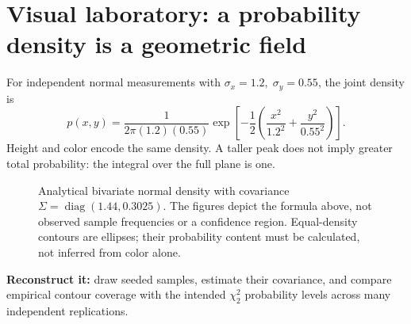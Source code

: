 \clearpage
\section*{Visual laboratory: a probability density is a geometric field}
\noindent For independent normal measurements with
\(\sigma_x=1.2,\;\sigma_y=0.55\), the joint density is
\[
p(x,y)=\frac{1}{2\pi(1.2)(0.55)}
\exp\!\left[-\frac12\!\left(\frac{x^2}{1.2^2}+
\frac{y^2}{0.55^2}\right)\right].
\]
Height and color encode the same density. A taller peak does not imply
greater total probability: the integral over the full plane is one.
\begin{figure}[!htbp]
\centering
{}
\caption{Analytical bivariate normal density with covariance
\(\Sigma=\operatorname{diag}(1.44,0.3025)\).
The figures depict the formula above, not observed sample frequencies or a confidence region.
Equal-density contours are ellipses; their probability content must be calculated, not inferred from color alone.}
\label{fig:book02-gaussian-uncertainty}
\end{figure}
\noindent\textbf{Reconstruct it:} draw seeded samples, estimate their
covariance, and compare empirical contour coverage with the intended
\(\chi^2_2\) probability levels across many independent replications.
